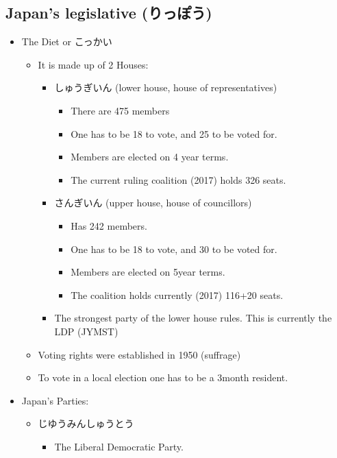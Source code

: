 \documentclass{article}
\begin{document}
\subsection{Japan's legislative (りっぽう) }
\begin{itemize}
    \item The Diet or こっかい
    \begin{itemize}
        \item It is made up of 2 Houses:
        \begin{itemize}
            \item しゅうぎいん (lower house, house of representatives)
            \begin{itemize}
                \item There are 475 members
                \item One has to be 18 to vote, and 25 to be voted for.
                \item Members are elected on 4 year terms.
                \item The current ruling coalition (2017) holds 326 seats.
            \end{itemize}
            \item さんぎいん (upper house, house of councillors)
            \begin{itemize}
                \item Has 242 members.
                \item One has to be 18 to vote, and 30 to be voted for.
                \item Members are elected on 5year terms.
                \item The coalition holds currently (2017) 116+20 seats.
            \end{itemize}
            \item The strongest party of the lower house rules. This is currently the LDP (JYMST)
        \end{itemize}
        \item Voting rights were established in 1950 (suffrage)
        \item To vote in a local election one has to be a 3month resident.
    \end{itemize}
    \item Japan's Parties:
    \begin{itemize}
        \item じゆうみんしゅうとう
        \begin{itemize}
            \item The Liberal Democratic Party.

\end{itemize}
\end{itemize}
\end{itemize}
\end{document}
